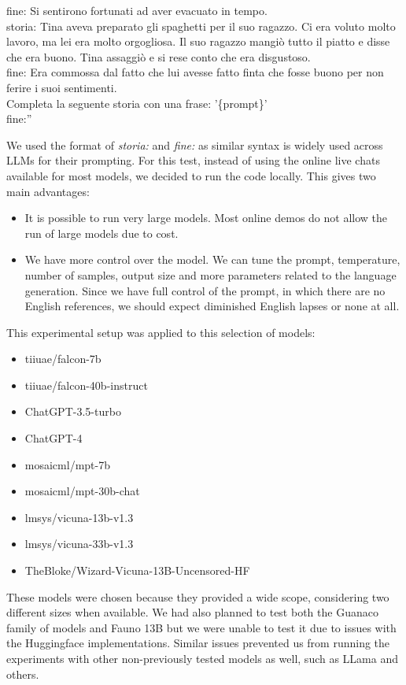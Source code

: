 \begin{itemize}
{                fine: Si sentirono fortunati ad aver evacuato in tempo.\\
                storia: Tina aveva preparato gli spaghetti per il suo ragazzo.	Ci era voluto molto lavoro, ma lei era molto orgogliosa.	Il suo ragazzo mangiò tutto il piatto e disse che era buono.	Tina assaggiò e si rese conto che era disgustoso.\\
                fine: Era commossa dal fatto che lui avesse fatto finta che fosse buono per non ferire i suoi sentimenti.\\
                Completa la seguente storia con una frase: '\{prompt\}'\\
                fine:''}
\end{itemize}
We used the format of \emph{storia:} and \emph{fine:} as similar syntax is widely used across LLMs for their prompting.
For this test, instead of using the online live chats available for most models, we decided to run the code locally. This gives two main advantages:
\begin{itemize}
    \item It is possible to run very large models. Most online demos do not allow the run of large models due to cost.
    \item We have more control over the model. We can tune the prompt, temperature, number of samples, output size and more parameters related to the language generation. Since we have full control of the prompt, in which there are no English references, we should expect diminished English lapses or none at all.
\end{itemize}
This experimental setup was applied to this selection of models:
\begin{itemize}
    \item   tiiuae/falcon-7b
    \item   tiiuae/falcon-40b-instruct
    \item   ChatGPT-3.5-turbo
    \item   ChatGPT-4
    \item   mosaicml/mpt-7b
    \item   mosaicml/mpt-30b-chat
    \item   lmsys/vicuna-13b-v1.3
    \item   lmsys/vicuna-33b-v1.3
    \item   TheBloke/Wizard-Vicuna-13B-Uncensored-HF
\end{itemize}
These models were chosen because they provided a wide scope, considering two different sizes when available.  We had also planned to test both the Guanaco family of models and Fauno 13B but we were unable to test it due to issues with the Huggingface implementations. Similar issues prevented us from running the experiments with other non-previously tested models as well, such as LLama and others.
